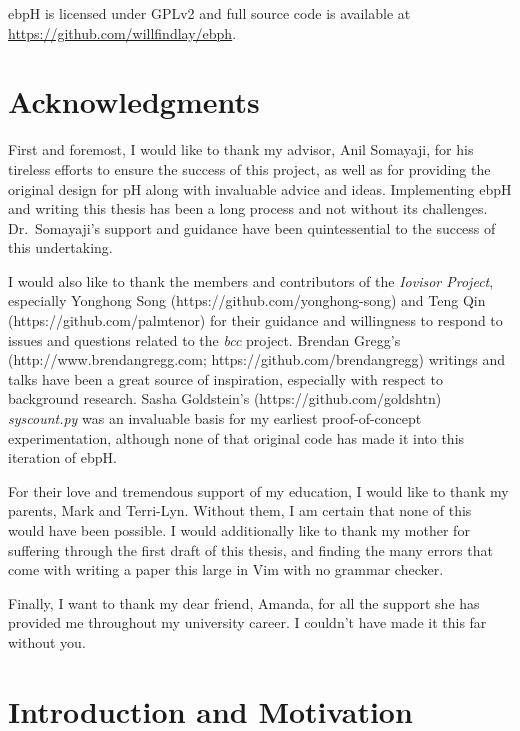 \documentclass[
  12pt]{findlay}
\begin{document}
ebpH is licensed under GPLv2 and full source code is available at
\url{https://github.com/willfindlay/ebph}.

\newpage
\section*{Acknowledgments}

First and foremost, I would like to thank my advisor, Anil Somayaji, for
his tireless efforts to ensure the success of this project, as well as
for providing the original design for pH along with invaluable advice
and ideas. Implementing ebpH and writing this thesis has been a long
process and not without its challenges. Dr.~Somayaji's support and
guidance have been quintessential to the success of this undertaking.

I would also like to thank the members and contributors of the
\emph{Iovisor Project}, especially Yonghong Song
(https://github.com/yonghong-song) and Teng Qin
(https://github.com/palmtenor) for their guidance and willingness to
respond to issues and questions related to the \emph{bcc} project.
Brendan Gregg's (http://www.brendangregg.com;
https://github.com/brendangregg) writings and talks have been a great
source of inspiration, especially with respect to background research.
Sasha Goldstein's (https://github.com/goldshtn) \emph{syscount.py} was
an invaluable basis for my earliest proof-of-concept experimentation,
although none of that original code has made it into this iteration of
ebpH.

For their love and tremendous support of my education, I would like to
thank my parents, Mark and Terri-Lyn. Without them, I am certain that
none of this would have been possible. I would additionally like to
thank my mother for suffering through the first draft of this thesis,
and finding the many errors that come with writing a paper this large in
Vim with no grammar checker.

Finally, I want to thank my dear friend, Amanda, for all the support she
has provided me throughout my university career. I couldn't have made it
this far without you.

\newpage
\singlespacing
\tableofcontents
\onehalfspacing

\newpage
\listoffigures
\newpage
\listoftables
\newpage
\lstlistoflistings

\newpage
{}
\setcounter{page}{1}

\hypertarget{introduction-and-motivation}{%
\section{Introduction and
Motivation}\label{introduction-and-motivation}}
\end{document}

